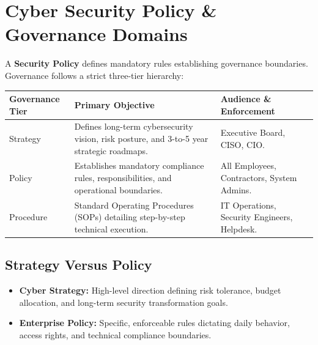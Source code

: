 \documentclass[12pt,a4paper]{article}
\renewcommand{\arraystretch}{1.45}
\begin{document}
\section{Cyber Security Policy \& Governance Domains}

\begin{tcolorbox}[defbox, title={\textbf{Definition: Security Policy Hierarchy}}]
A \textbf{Security Policy} defines mandatory rules establishing governance boundaries. Governance follows a strict three-tier hierarchy:
\end{tcolorbox}

{\renewcommand{\arraystretch}{1.45}%
\begin{tabularx}{\linewidth}{|B{3.0cm}|Y|Y|}
\hline
\textbf{Governance Tier} & \textbf{Primary Objective} & \textbf{Audience \& Enforcement} \\
\hline
Strategy & Defines long-term cybersecurity vision, risk posture, and 3-to-5 year strategic roadmaps. & Executive Board, CISO, CIO. \\
\hline
Policy & Establishes mandatory compliance rules, responsibilities, and operational boundaries. & All Employees, Contractors, System Admins. \\
\hline
Procedure & Standard Operating Procedures (SOPs) detailing step-by-step technical execution. & IT Operations, Security Engineers, Helpdesk. \\
\hline
\end{tabularx}}

\subsection{Strategy Versus Policy}
\begin{itemize}[leftmargin=*, itemsep=3pt]
  \item \textbf{Cyber Strategy:} High-level direction defining risk tolerance, budget allocation, and long-term security transformation goals.
  \item \textbf{Enterprise Policy:} Specific, enforceable rules dictating daily behavior, access rights, and technical compliance boundaries.
\end{itemize}
\end{document}
